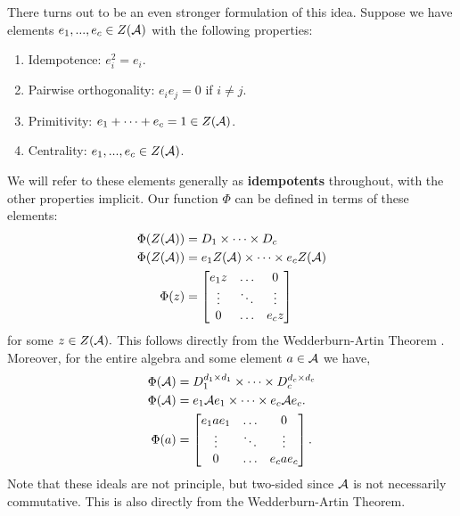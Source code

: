 \documentclass[../thesis.tex]{subfiles}
\begin{document}
There turns out to be an even stronger formulation of this idea. Suppose we have elements $e_1,...,e_c\in Z(\mathcal{A})$ with the following properties:
\begin{enumerate}
    \item Idempotence: $e_i^2 = e_i$.
    \item Pairwise orthogonality: $e_ie_j = 0$ if $i\neq j$.
    \item Primitivity: $e_1+\cdots+e_c = 1\in Z(\mathcal{A})$.
    \item Centrality: $e_1,...,e_c\in Z(\mathcal{A})$.
\end{enumerate}
We will refer to these elements generally as \textbf{idempotents} throughout, with the other properties implicit. Our function $\Phi$ can be defined in terms of these elements:
\begin{equation}\label{eq:IdempotentDecompZ}
\begin{aligned}
    \Phi(Z(\mathcal{A})) &= D_1\times\cdots\times D_c \\
    \Phi(Z(\mathcal{A})) &= e_1Z(\mathcal{A})\times\cdots\times e_cZ(\mathcal{A})\\
    \Phi(z) &= \begin{bmatrix}
        e_1z   & \hdots & 0\\
        \vdots & \ddots & \vdots\\
        0      & \hdots & e_cz
    \end{bmatrix}
\end{aligned}
\end{equation}
for some $z\in Z(\mathcal{A}).$ This follows directly from the Wedderburn-Artin Theorem \cite{hypercomplexArt}\cite{hypercomplexWedd}. Moreover, for the entire algebra and some element $a\in\mathcal{A}$ we have,
\begin{equation}\label{eq:IdempotentDecompA}
\begin{aligned}
    \Phi(\mathcal{A}) &= D_1^{d_1\times d_1}\times\cdots\times D_c^{d_c\times d_c}\\
    \Phi(\mathcal{A}) &= e_1\mathcal{A} e_1\times\cdots\times e_c\mathcal{A} e_c.\\
    \Phi(a)  &= \begin{bmatrix}
        e_1ae_1   & \hdots & 0\\
        \vdots & \ddots & \vdots\\
        0      & \hdots & e_cae_c
    \end{bmatrix}.
\end{aligned}
\end{equation}
Note that these ideals are not principle, but two-sided since $\mathcal{A}$ is not necessarily commutative. This is also directly from the Wedderburn-Artin Theorem. 
\end{document}
